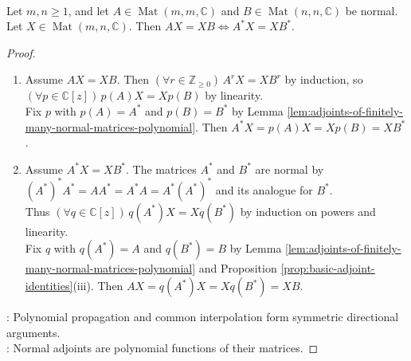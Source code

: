 \begin{theorem} \label{thm:fuglede-putnam-normal-intertwining} \\
Let $m,n\geq1$, and let $A\in\operatorname{Mat}(m,m,\mathbb{C})$ and $B\in\operatorname{Mat}(n,n,\mathbb{C})$ be normal. Let $X\in\operatorname{Mat}(m,n,\mathbb{C})$. Then $AX=XB\Longleftrightarrow A^*X=XB^*$.
\begin{proof}
\begin{enumerate}[label=\roman*.]
\setlength{\itemsep}{0pt}
\item[$(\Rightarrow)$] Assume $AX=XB$. Then $(\forall r\in\mathbb{Z}_{\geq0})\,A^rX=XB^r$ by induction, so $(\forall p\in\mathbb{C}[z])\,p(A)X=Xp(B)$ by linearity.\\
Fix $p$ with $p(A)=A^*$ and $p(B)=B^*$ by Lemma \ref{lem:adjoints-of-finitely-many-normal-matrices-polynomial}. Then $A^*X=p(A)X=Xp(B)=XB^*$.
\item[$(\Leftarrow)$] Assume $A^*X=XB^*$. The matrices $A^*$ and $B^*$ are normal by $(A^*)^*A^*=AA^*=A^*A=A^*(A^*)^*$ and its analogue for $B^*$.\\
Thus $(\forall q\in\mathbb{C}[z])\,q(A^*)X=Xq(B^*)$ by induction on powers and linearity.\\
Fix $q$ with $q(A^*)=A$ and $q(B^*)=B$ by Lemma \ref{lem:adjoints-of-finitely-many-normal-matrices-polynomial} and Proposition \ref{prop:basic-adjoint-identities}(iii). Then $AX=q(A^*)X=Xq(B^*)=XB$.
\end{enumerate}
: Polynomial propagation and common interpolation form symmetric directional arguments.\\
: Normal adjoints are polynomial functions of their matrices.
\end{proof}
\end{theorem}

